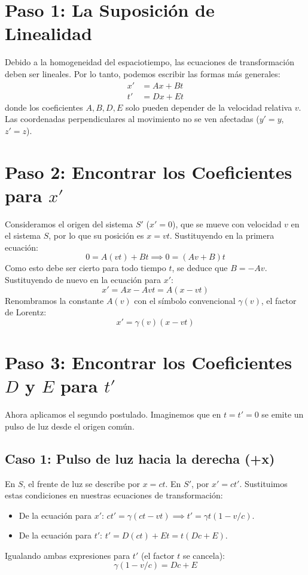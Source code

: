 \documentclass[11pt,a4paper]{book}
\begin{document}
\section*{Paso 1: La Suposición de Linealidad}
Debido a la homogeneidad del espaciotiempo, las ecuaciones de transformación deben ser lineales. Por lo tanto, podemos escribir las formas más generales:
\begin{align*}
    x' &= Ax + Bt \\
    t' &= Dx + Et
\end{align*}
donde los coeficientes $A, B, D, E$ solo pueden depender de la velocidad relativa $v$. Las coordenadas perpendiculares al movimiento no se ven afectadas ($y'=y$, $z'=z$).

\section*{Paso 2: Encontrar los Coeficientes para \texorpdfstring{$x'$}{x'}}
Consideramos el origen del sistema $S'$ ($x'=0$), que se mueve con velocidad $v$ en el sistema $S$, por lo que su posición es $x=vt$. Sustituyendo en la primera ecuación:
\[ 0 = A(vt) + Bt \implies 0 = (Av + B)t \]
Como esto debe ser cierto para todo tiempo $t$, se deduce que $B = -Av$. Sustituyendo de nuevo en la ecuación para $x'$:
\[ x' = Ax - Avt = A(x-vt) \]
Renombramos la constante $A(v)$ con el símbolo convencional $\gamma(v)$, el factor de Lorentz:
\begin{equation} \label{eq:x_prime_trans}
    \boxed{x' = \gamma(v)(x - vt)}
\end{equation}

\section*{Paso 3: Encontrar los Coeficientes \texorpdfstring{$D$}{D} y \texorpdfstring{$E$}{E} para \texorpdfstring{$t'$}{t'}}
Ahora aplicamos el segundo postulado. Imaginemos que en $t=t'=0$ se emite un pulso de luz desde el origen común.

\subsection*{Caso 1: Pulso de luz hacia la derecha (+x)}
En $S$, el frente de luz se describe por $x = ct$. En $S'$, por $x' = ct'$. Sustituimos estas condiciones en nuestras ecuaciones de transformación:
\begin{itemize}
    \item De la ecuación para $x'$: $ct' = \gamma(ct - vt) \implies t' = \gamma t (1 - v/c)$.
    \item De la ecuación para $t'$: $t' = D(ct) + Et = t(Dc + E)$.
\end{itemize}
Igualando ambas expresiones para $t'$ (el factor $t$ se cancela):
\begin{equation} \label{eq:sys1}
    \gamma (1 - v/c) = Dc + E
\end{equation}
\end{document}
